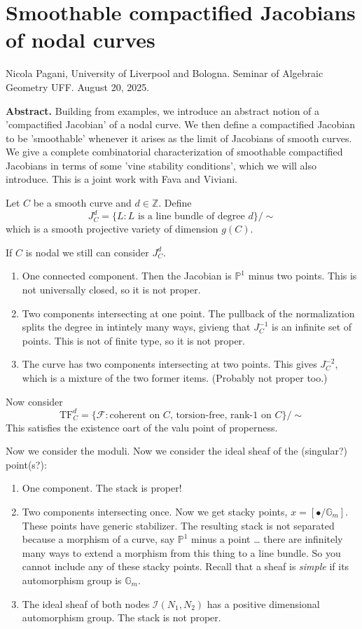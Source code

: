 \section{Smoothable compactified Jacobians of
nodal curves}
\label{section-smoot-compa-jacob-nodal}

\noindent
Nicola Pagani, University of Liverpool and
Bologna.
Seminar of Algebraic Geometry UFF.
August 20, 2025.

\medskip\noindent
{\bf Abstract.} Building from examples, we
introduce an abstract notion of a
'compactified Jacobian' of a nodal curve. We
then define a compactified Jacobian
to be 'smoothable' whenever it arises as the
limit of Jacobians of smooth
curves. We give a complete combinatorial
characterization of smoothable
compactified Jacobians in terms of some 'vine
stability conditions', which we
will also introduce. This is a joint work
with Fava and Viviani.

\medskip\noindent



Let $C$ be a smooth curve and $d \in
\mathbb{Z}$. Define
$$
J^d_C=\{L:\text{$L$ is a line bundle of
degree $d$}\}/\sim
$$
which is a smooth projective variety of
dimension $g(C)$.

If $C$ is nodal we still can consider
$J^d_C$.
\begin{enumerate}
\item One connected component. Then the
Jacobian is $\mathbb{P}^1$ minus two
points. This is not universally closed, so it
is not proper.
\item Two components intersecting at one
point.
The pullback of the normalization splits the
degree in
intintely many ways, givieng that $J^{-1}_C$
is an infinite set of points. This
is not of finite type, so it is not proper.
\item The curve has two components
intersecting at two points.
This gives $J^{-2}_C$,
 which is a mixture of the two former items.
 (Probably not proper too.)
\end{enumerate}

\medskip\noindent
Now consider
$$
\text{TF}_C^d=\{\mathcal{F}:
\text{coherent on $C$, torsion-free, rank-1
on $C$}\}/\sim
$$
This satisfies the existence oart of the valu
point of properness.

Now we consider the moduli. Now we consider
the ideal sheaf of the (singular?)
point(s?):
\begin{enumerate}
\item One component. The stack is proper!
\item Two components intersecting once. Now
we get stacky points,
$x=[\bullet/\mathbb{G}_m]$. These points have
generic stabilizer. The resulting
stack is not separated because a morphism of
a curve, say $\mathbb{P}^1$ minus a
point … there are infinitely many ways to
extend a morphism from this thing to a
line bundle. So you cannot include any of
these stacky points. Recall that a
sheaf is {\it simple} if its automorphism
group is $\mathbb{G}_m$.
\item  The ideal sheaf of both nodes
$\mathcal{I}(N_1,N_2)$ has a positive
dimensional automorphism
group. The stack is not proper.
\end{enumerate}

